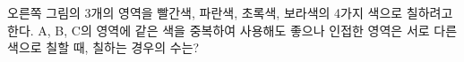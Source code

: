 \noindent\begin{minipage}[t]{0.58\linewidth}\vspace{0pt}\raggedright 오른쪽 그림의 3개의 영역을 빨간색, 파란색, 초록색, 보라색의 4가지 색으로 칠하려고 한다. A, B, C의 영역에 같은 색을 중복하여 사용해도 좋으나 인접한 영역은 서로 다른 색으로 칠할 때, 칠하는 경우의 수는? \end{minipage}\hfill\begin{minipage}[t]{0.4\linewidth}\vspace{0pt}\centering \resizebox{\ifdim\width>\linewidth\linewidth\else\width\fi}{!}{}\end{minipage}\par
{}

